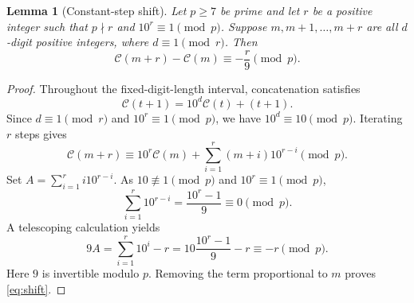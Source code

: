 \documentclass[10pt]{article}
\newtheorem{lemma}{Lemma}
\newcommand{\Cham}{\mathcal{C}}
\begin{document}
\begin{lemma}[Constant-step shift]\label{lem:shift}
Let $p\ge7$ be prime and let $r$ be a positive integer such that
$p\nmid r$ and $10^r\equiv1\pmod p$. Suppose $m,m+1,\ldots,m+r$
are all $d$-digit positive integers, where $d\equiv1\pmod r$.
Then
\begin{equation}\label{eq:shift}
  \Cham(m+r)-\Cham(m)\equiv-\frac{r}{9}\pmod p.
\end{equation}
\end{lemma}
\begin{proof}
Throughout the fixed-digit-length interval, concatenation satisfies
\[
  \Cham(t+1)=10^d\Cham(t)+(t+1).
\]
Since $d\equiv1\pmod r$ and $10^r\equiv1\pmod p$,
we have $10^d\equiv10\pmod p$. Iterating $r$ steps gives
\[
  \Cham(m+r)\equiv10^r\Cham(m)
           +\sum_{i=1}^{r}(m+i)10^{r-i}\pmod p.
\]
Set $A=\sum_{i=1}^r i10^{r-i}$.
As $10\not\equiv1\pmod p$ and $10^r\equiv1\pmod p$,
\[
  \sum_{i=1}^{r}10^{r-i}=\frac{10^r-1}{9}\equiv0\pmod p.
\]
A telescoping calculation yields
\[
  9A=\sum_{i=1}^{r}10^i-r
      =10\frac{10^r-1}{9}-r\equiv-r\pmod p.
\]
Here $9$ is invertible modulo $p$. Removing the term proportional
to $m$ proves \eqref{eq:shift}.
\end{proof}
\end{document}
